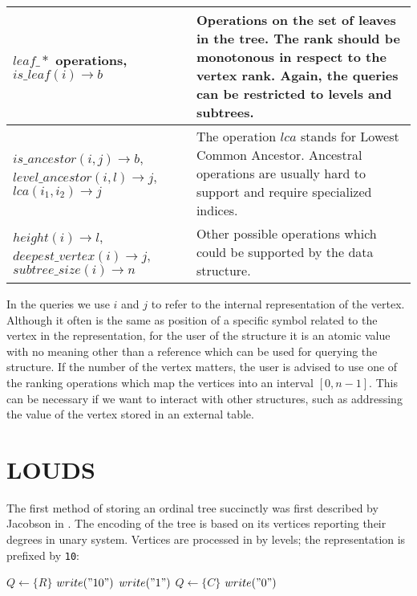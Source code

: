 \begin{tabularx}{\textwidth}{|L{0.7}|L{1.3}|}
	$leaf\_*$ operations, \newline
	$is\_leaf(i) \rightarrow b$
	& Operations on the set of leaves in the tree.
	The rank should be monotonous in respect to the vertex rank. 
	Again, the queries can be restricted to levels and subtrees.\\ \hline \hline
	
	$is\_ancestor(i, j) \rightarrow b$, \newline
	$level\_ancestor(i, l) \rightarrow j$, \newline
	$lca(i_1, i_2) \rightarrow j$
	& The operation $lca$ stands for Lowest Common Ancestor.
	Ancestral operations are usually hard to support and require specialized indices. \\ \hline
	
	$height(i) \rightarrow l$, \newline
	$deepest\_vertex(i) \rightarrow j$, \newline
	$subtree\_size(i) \rightarrow n$
	& Other possible operations which could be supported by the data structure. \\ \hline
\end{tabularx}

In the queries we use $i$ and $j$ to refer to the internal representation of the vertex.
Although it often is the same as position of a specific symbol related to the vertex in the representation, for the user of the structure it is an atomic value with no meaning other than a reference which can be used for querying the structure.
If the number of the vertex matters, the user is advised to use one of the ranking operations which map the vertices into an interval $[0, n-1]$.
This can be necessary if we want to interact with other structures, such as addressing the value of the vertex stored in an external table.

\section{LOUDS}

The first method of storing an ordinal tree succinctly was first described by Jacobson in .
The encoding of the tree is based on its vertices reporting their degrees in unary system.
Vertices are processed in by levels; the representation is prefixed by \verb|10|:
\begin{algorithmic}
	\State $Q \gets \{R\}$ 
	\State $write("10")$
			\State $write("1")$
			\State $Q \gets \{C\}$
		\EndFor
		\State $write("0")$
	\EndWhile
\EndFunction
\end{algorithmic}

